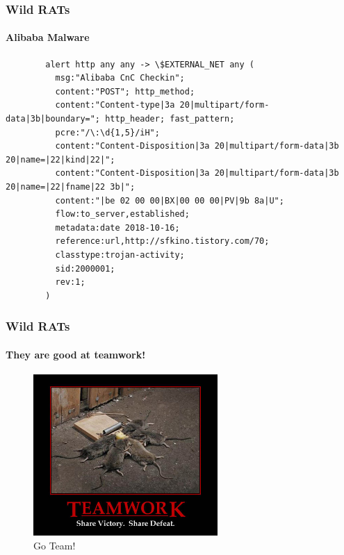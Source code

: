 \documentclass[aspectratio=169]{beamer}
\begin{document}
\begin{frame}[fragile]{}
  \frametitle{Wild RATs}
  \framesubtitle{Alibaba Malware}
  \begin{center}
    \begin{tcolorbox}[title=alibaba.rules,colback=black]
    \begin{minipage}{0.5\textwidth}
      \begin{verbatim}
        alert http any any -> \$EXTERNAL_NET any (
          msg:"Alibaba CnC Checkin";
          content:"POST"; http_method;
          content:"Content-type|3a 20|multipart/form-data|3b|boundary="; http_header; fast_pattern;
          pcre:"/\:\d{1,5}/iH";
          content:"Content-Disposition|3a 20|multipart/form-data|3b 20|name=|22|kind|22|";
          content:"Content-Disposition|3a 20|multipart/form-data|3b 20|name=|22|fname|22 3b|";
          content:"|be 02 00 00|BX|00 00 00|PV|9b 8a|U";
          flow:to_server,established;
          metadata:date 2018-10-16;
          reference:url,http://sfkino.tistory.com/70;
          classtype:trojan-activity;
          sid:2000001;
          rev:1;
        )
      \end{verbatim}
    \end{minipage}
    \end{tcolorbox}
  \end{center}
\end{frame}

\begin{frame}
  \frametitle{Wild RATs}
  \framesubtitle{They are good at teamwork!}
  \begin{center}
    \begin{figure}
      \includegraphics[width=7cm,keepaspectratio]{team_work}
      \caption{Go Team!}
    \end{figure}
  \end{center}
\end{frame}
\end{document}
